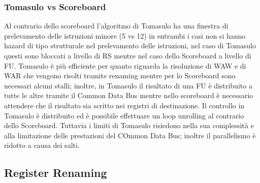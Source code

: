 \subsubsection{Tomasulo vs Scoreboard}
Al contrario dello scoreboard l'algoritmo di Tomasulo ha una finestra di prelevamento delle istruzioni minore (5 vs 12) in entrambi i casi non si hanno hazard di tipo strutturale nel prelevamento delle istruzioni, nel caso di Tomasulo questi sono bloccati a livello di RS mentre nel caso dello Scoreboard a livello di FU. Tomasulo è più efficiente per quanto riguarda la risoluzione di WAW e di WAR che vengono risolti tramite renaming mentre per lo Scoreboard sono necessari alcuni stalli; inoltre, in Tomasulo il risultato di una FU è distribuito a tutte le altre tramite il Common Data Bus mentre nello scoreboard è necessario attendere che il risultato sia scritto nei registri di destinazione. Il controllo in Tomasulo è distribuito ed è possibile effettuare un loop unrolling al contrario dello Scoreboard. Tuttavia i limiti di Tomasulo risiedono nella sua complessità e alla limitazione delle prestazioni del COmmon Data Bus; inoltre il parallelismo è ridotto a causa dei salti.
\subsection{Register Renaming}
